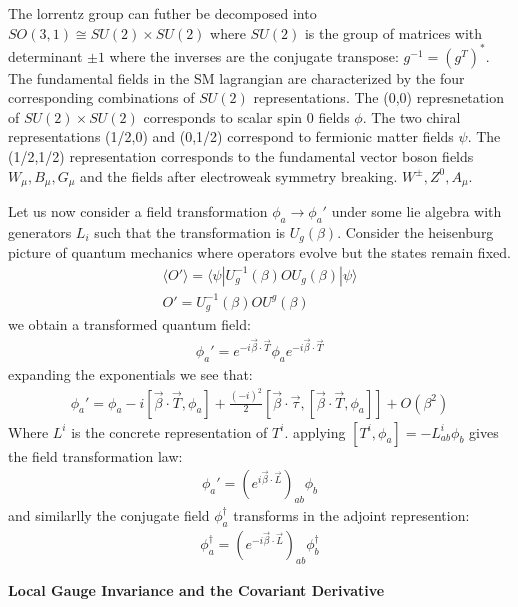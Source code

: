 The lorrentz group can futher be decomposed into  $SO(3,1) \cong SU(2) \times SU(2)$
where $SU(2)$ is the group of matrices with determinant $\pm 1$ where the inverses are
 the conjugate transpose: $g^{-1} = (g^{T})^*$. The fundamental fields in the SM
lagrangian are characterized by the four corresponding combinations of $SU(2)$ representations. The (0,0) represnetation 
of $SU(2) \times SU(2)$ corresponds to scalar spin 0 fields $\phi$. The two chiral representations (1/2,0) and (0,1/2)
correspond to fermionic matter fields $\psi$. The (1/2,1/2) representation corresponds to the fundamental 
vector boson fields $W_\mu, B_\mu, G_\mu$ and the fields after electroweak symmetry breaking. $W^{\pm}, Z^0, A_\mu$. 


Let us now consider a field transformation $\phi_a \rightarrow \phi_a'$ under some lie algebra with
generators $L_i$ such that the transformation is $U_g(\beta)$. Consider the heisenburg picture of quantum mechanics where operators evolve but 
the states remain fixed. 
\begin{align*}
\langle O' \rangle = \langle \psi | U_g^{-1}(\beta) O U_g(\beta) | \psi \rangle\\
O'= U_g^{-1}(\beta) O U^g(\beta)
\end{align*}
we obtain a transformed quantum field:
\begin{align*}
\phi_a' = e^{-i \vec \beta \cdot \vec T} \phi_a e^{-i \vec \beta \cdot \vec T}
\end{align*}
expanding the exponentials we see that:
\begin{align*}
\phi_a' = \phi_a - i [ \vec \beta \cdot \vec T, \phi_a] + \frac{(-i)^2}{2}[ \vec \beta \cdot \vec \tau, [ \vec \beta \cdot \vec T, \phi_a]] + O(\beta^2)
\end{align*}
Where $L^i$ is the concrete representation of $T^i$. applying $[T^i, \phi_a] = - L_{ab}^i \phi_b$ gives the field transformation law:
\begin{align*}
\phi_a' = \left (e^{i \vec \beta \cdot \vec L} \right)_{ab} \phi_b 
\end{align*}
and similarlly the conjugate field $\phi^\dagger_a$ transforms in the adjoint represention:
\begin{align*}
\phi_a^\dagger = \left( e^{-i \vec \beta \cdot \vec L} \right)_{ab} \phi^\dagger_b 
\end{align*}

\textbf{Local Gauge Invariance and the Covariant Derivative} 

